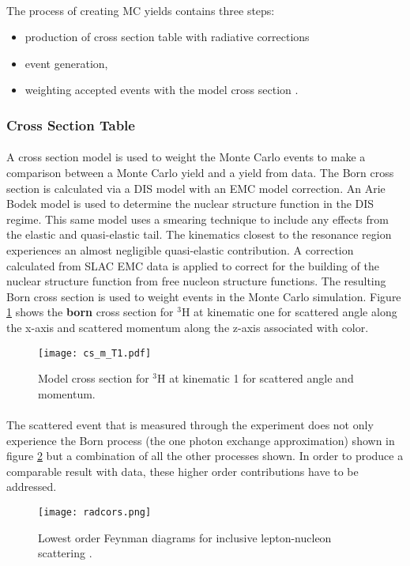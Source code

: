\paragraph{}The process of creating MC yields contains three steps: 
\begin{itemize}
	\item production of cross section table with radiative corrections
	\item event generation,
	\item weighting accepted events with the model cross section .
\end{itemize} 
\subsubsection{Cross Section Table}
\vspace{-10pt}\paragraph{} A cross section model is used to weight the Monte Carlo events to make a comparison between a Monte Carlo yield and a yield from data. The Born cross section is calculated via a DIS model with an EMC model correction. An Arie Bodek model \cite{DISmodel} is used to determine the nuclear structure function in the DIS regime. This same model uses a smearing technique to include any effects from the elastic and quasi-elastic tail. The kinematics closest to the resonance region experiences an almost negligible quasi-elastic contribution. A correction calculated from SLAC EMC data is applied to correct for the building of the nuclear structure function from free nucleon structure functions. The resulting Born cross section is used to weight events in the Monte Carlo simulation. Figure \ref{MCS} shows the \textbf{born} cross section for $^3$H at kinematic one for scattered angle along the x-axis and scattered momentum along the z-axis associated with color.  

\begin{figure}[t]
	\texttt{[image: cs\_m\_T1.pdf]}
		\caption{Model cross section for $^3$H at kinematic 1 for scattered angle and momentum. \label{MCS}}
\end{figure}
\paragraph{} The scattered event that is measured through the experiment does not only experience the Born process (the one photon exchange approximation) shown in figure \ref{fig:radcors} but a combination of all the other processes shown. In order to produce a comparable result with data, these higher order contributions have to be addressed.
\begin{figure}[t]
	\centering
	\texttt{[image: radcors.png]}
	\caption{Lowest order Feynman diagrams for inclusive lepton-nucleon scattering \cite{Ajth}.}
	\label{fig:radcors}
\end{figure} 
